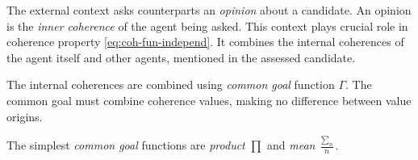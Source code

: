 \documentclass[../ThesisDoc]{subfiles}
\begin{document}
\providecommand{\rootdir}{..}

The external context asks counterparts an \emph{opinion} about a candidate.
An opinion is the \emph{inner coherence} of the agent being asked. This context
plays crucial role in coherence property \ref{eq:coh-fun-independ}. It combines
the internal coherences of the agent itself and other agents, mentioned in the
assessed candidate.



The internal coherences are combined using \emph{common goal} function $\Gamma$.
The common goal must combine coherence values, making no difference
between value origins.

The simplest \emph{common goal} functions are \emph{product} $\prod$
and \emph{mean} $\frac{\sum_n}{n}$.


\end{document}
